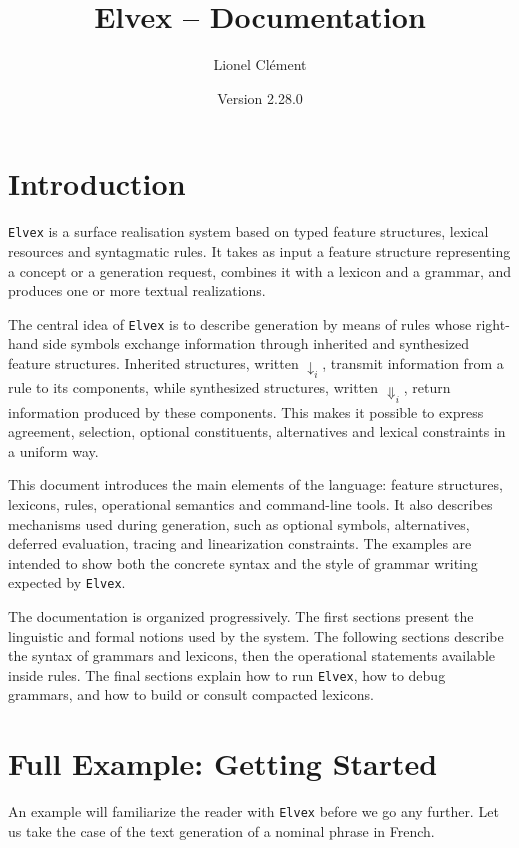 \documentclass[11pt]{article}
\title{Elvex -- Documentation}
\author{Lionel Clément}
\date{Version 2.28.0}
\begin{document}
\maketitle
\tableofcontents
\clearpage

\section*{Introduction}

\texttt{Elvex} is a surface realisation system based on typed feature
structures, lexical resources and syntagmatic rules. It takes as input a
feature structure representing a concept or a generation request, combines
it with a lexicon and a grammar, and produces one or more textual
realizations.

The central idea of \texttt{Elvex} is to describe generation by means of
rules whose right-hand side symbols exchange information through inherited
and synthesized feature structures. Inherited structures, written
$\downarrow_i$, transmit information from a rule to its components, while
synthesized structures, written $\Downarrow_i$, return information produced
by these components. This makes it possible to express agreement,
selection, optional constituents, alternatives and lexical constraints in a
uniform way.

This document introduces the main elements of the language: feature
structures, lexicons, rules, operational semantics and command-line tools.
It also describes mechanisms used during generation, such as optional
symbols, alternatives, deferred evaluation, tracing and linearization
constraints. The examples are intended to show both the concrete syntax and
the style of grammar writing expected by \texttt{Elvex}.

The documentation is organized progressively. The first sections present
the linguistic and formal notions used by the system. The following
sections describe the syntax of grammars and lexicons, then the operational
statements available inside rules. The final sections explain how to run
\texttt{Elvex}, how to debug grammars, and how to build or consult
compacted lexicons.

\section{Full Example: Getting Started}

An example will familiarize the reader with \texttt{Elvex} before we
go any further. Let us take the case of the text generation of a
nominal phrase in French.
\end{document}

